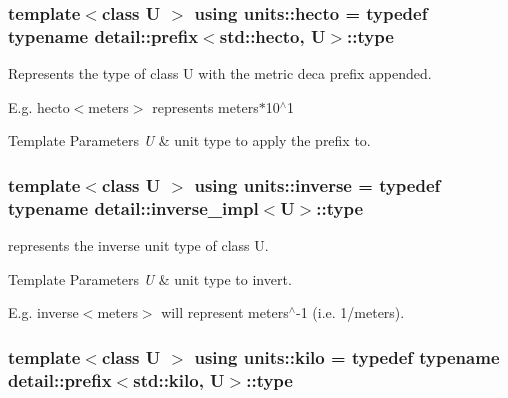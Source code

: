 \subsubsection[{hecto}]{\setlength{\rightskip}{0pt plus 5cm}template$<$class U $>$ using {\bf units\+::hecto} = typedef typename detail\+::prefix$<$std\+::hecto, U$>$\+::type}\label{group___unit_manipulators_gaf3fc3cf9567ce9a93f880419c4ddac46}


Represents the type of {\ttfamily class U} with the metric \textquotesingle{}deca\textquotesingle{} prefix appended. 

E.\+g. hecto$<$meters$>$ represents meters$\ast$10$^\wedge$1 
\begin{DoxyTemplParams}{Template Parameters}
{\em U} & unit type to apply the prefix to. \\
\hline
\end{DoxyTemplParams}
\hypertarget{group___unit_manipulators_gaacc539ef162e24b260d023d3ff949b57}{}
\subsubsection[{inverse}]{\setlength{\rightskip}{0pt plus 5cm}template$<$class U $>$ using {\bf units\+::inverse} = typedef typename detail\+::inverse\+\_\+impl$<$U$>$\+::type}\label{group___unit_manipulators_gaacc539ef162e24b260d023d3ff949b57}


represents the inverse unit type of {\ttfamily class U}. 


\begin{DoxyTemplParams}{Template Parameters}
{\em U} & {\ttfamily unit} type to invert.\\
\hline
\end{DoxyTemplParams}
E.\+g. {\ttfamily inverse$<$meters$>$} will represent meters$^\wedge$-\/1 (i.\+e. 1/meters). \hypertarget{group___unit_manipulators_ga89965a45aaa6689548b9c53858759c5e}{}
\subsubsection[{kilo}]{\setlength{\rightskip}{0pt plus 5cm}template$<$class U $>$ using {\bf units\+::kilo} = typedef typename detail\+::prefix$<$std\+::kilo, U$>$\+::type}\label{group___unit_manipulators_ga89965a45aaa6689548b9c53858759c5e}


